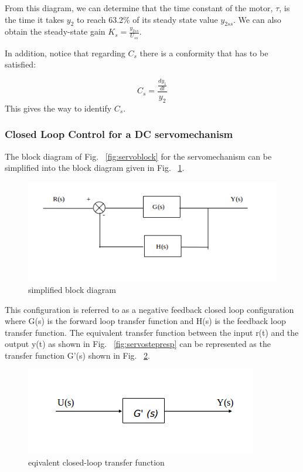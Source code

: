\documentclass[11pt,a4paper]{article}
\begin{document}
From this diagram, we can determine that the time constant of the motor, $\tau$, is the time it takes $y_{2}$ to reach 63.2\% of its steady state value $y_{2ss}$. We can also obtain the steady-state gain $K_{s} = \frac{y_{2ss}}{U_{ss}}$.

In addition, notice that regarding $C_{s}$ there is a conformity that has to be satisfied:

\begin{equation} \label{eq:14}
C_{s} = \frac{\frac{dy_{1}}{dt}}{y_2}
\end{equation}
This gives the way to identify $C_{s}$.

\subsubsection{Closed Loop Control for a DC servomechanism}
The block diagram of Fig. ~\ref{fig:servoblock} for the servomechanism can be simplified into the block diagram given in Fig. ~\ref{fig:servotfblock}.

\begin{figure}[here]
\includegraphics{imglab/servotfblock.png}
\caption{simplified block diagram}
\label{fig:servotfblock}
\end{figure}

This configuration is referred to as a negative feedback closed loop configuration where G(s) is the forward loop transfer function and H(s) is the feedback loop transfer function. The equivalent transfer function between the input r(t) and the output y(t) as shown in Fig. ~\ref{fig:servostepresp} can be represented as the transfer function G'(s) shown in Fig. ~\ref{fig:servocltfblock}.

\begin{figure}[here]
\includegraphics{imglab/servocltfblock.png}
\caption{eqivalent closed-loop transfer function}
\label{fig:servocltfblock}
\end{figure}
\end{document}
